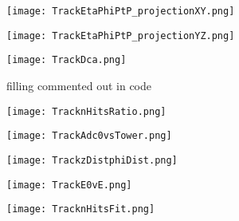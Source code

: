 \documentclass{beamer}
\begin{document}
\begin{frame}
  \begin{figure}[h!]
  \centering
  \texttt{[image: TrackEtaPhiPtP\_projectionXY.png]}
  \end{figure}
\end{frame}

\begin{frame}
  \begin{figure}[h!]
  \centering
  \texttt{[image: TrackEtaPhiPtP\_projectionYZ.png]}
  \end{figure}
\end{frame}

\begin{frame}
  \begin{figure}[h!]
  \centering
  \texttt{[image: TrackDca.png]}
  \caption{filling commented out in code}
  \end{figure}
\end{frame}

\begin{frame}
  \begin{figure}[h!]
  \centering
  \texttt{[image: TracknHitsRatio.png]}
  \end{figure}
\end{frame}

\begin{frame}
  \begin{figure}[h!]
  \centering
  \texttt{[image: TrackAdc0vsTower.png]}
  \end{figure}
\end{frame}

\begin{frame}
  \begin{figure}[h!]
  \centering
  \texttt{[image: TrackzDistphiDist.png]}
  \end{figure}
\end{frame}

\begin{frame}
  \begin{figure}[h!]
  \centering
  \texttt{[image: TrackE0vE.png]}
  \end{figure}
\end{frame}

\begin{frame}
  \begin{figure}[h!]
  \centering
  \texttt{[image: TracknHitsFit.png]}
  \end{figure}
\end{frame}
\end{document}
